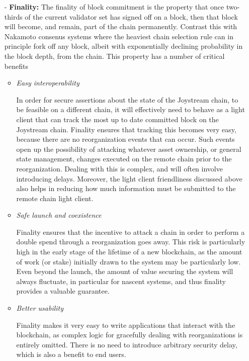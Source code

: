 \documentclass{article}
\begin{document}
\begin{itemize}
    \item[-] \textbf{Finality:} The finality of block commitment is the property that once two-thirds of the current validator set has signed off on a block, then that block will become, and remain, part of the chain permanently. Contrast this with Nakamoto consenus systems  where the heaviest chain selection rule can in principle fork off any block, albeit with exponentially declining probability in the block depth, from the chain. This property has a number of critical benefits

    \begin{itemize}

        \item \textit{Easy interoperability}

        In order for secure assertions about the state of the Joystream chain, to be feasible on a different chain, it will effectively need to behave as a light client that can track the most up to date committed block on the Joystream chain. Finality ensures that tracking this becomes very easy, because there are no reorganization events that can occur. Such events open up the possibility of attacking whatever asset ownership, or general state management, changes executed on the remote chain prior to the reorganization. Dealing with this is complex, and will often involve introducing delays. Moreover, the light client friendliness discussed above also helps in reducing how much information must be submitted to the remote chain light client.

        \item \textit{Safe launch and coexistence}

        Finality ensures that the incentive to attack a chain in order to perform a double spend through a reorganization goes away. This risk is particularly high in the early stage of the lifetime of a new blockchain, as the amount of work (or stake) initially drawn to the system may be particularly low. Even beyond the launch, the amount of value securing the system will always fluctuate, in particular for nascent systems, and thus finality provides a valuable guarantee.

        \item \textit{Better usability}

        Finality makes it very easy to write applications that interact with the blockchain, as complex logic for gracefully dealing with reorganizations is entirely omitted. There is no need to introduce arbitrary security delay, which is also a benefit to end users.

    \end{itemize}

\end{itemize}
\end{document}
